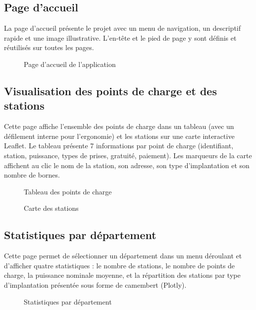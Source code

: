 \documentclass[a4paper,11pt]{article}
\begin{document}
\subsection{Page d'accueil}

La page d'accueil présente le projet avec un menu de navigation, un descriptif rapide et
une image illustrative. L'en-tête et le pied de page y sont définis et réutilisés sur
toutes les pages.

\begin{figure}[h]
  \centering
  \caption{Page d'accueil de l'application}
\end{figure}

\subsection{Visualisation des points de charge et des stations}

Cette page affiche l'ensemble des points de charge dans un tableau (avec un défilement
interne pour l'ergonomie) et les stations sur une carte interactive Leaflet. Le tableau
présente 7 informations par point de charge (identifiant, station, puissance, types de
prises, gratuité, paiement). Les marqueurs de la carte affichent au clic le nom de la
station, son adresse, son type d'implantation et son nombre de bornes.

\begin{figure}[h]
  \centering
  \caption{Tableau des points de charge}
\end{figure}

\begin{figure}[h]
  \centering
  \caption{Carte des stations}
\end{figure}

\subsection{Statistiques par département}

Cette page permet de sélectionner un département dans un menu déroulant et d'afficher
quatre statistiques : le nombre de stations, le nombre de points de charge, la puissance
nominale moyenne, et la répartition des stations par type d'implantation présentée sous
forme de camembert (Plotly).

\begin{figure}[h]
  \centering
  \caption{Statistiques par département}
\end{figure}
\end{document}
